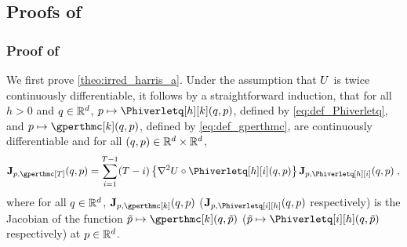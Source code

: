 \subsection{Proofs of }



\subsubsection{Proof of  }
\label{sec:proof-crefth-harris_0}
We first prove  \eqref{theo:irred_harris_a}.  Under the assumption that $U$ is twice continuously
  differentiable, it follows by a straightforward induction, that for
  all $h >0$ and $q \in \mathbb{R}^d$, $p \mapsto
  \Phiverletq[h][k](q,p)$, defined by  \eqref{eq:def_Phiverletq}, and $p \mapsto \gperthmc[k](q,p)$, defined by \eqref{eq:def_gperthmc}, are
  continuously differentiable and for all $(q,p) \in \mathbb{R}^d \times
  \mathbb{R}^d$,
\begin{equation}
  \Jac_{p,\gperthmc[T]}(q,p) =  \sum_{i=1}^{T-1}(T-i)\defEns{\nabla^2 \F \circ \Phiverletq[h][i](q,p)} \Jac_{p,\Phiverletq[h][i]}(q,p) \eqsp,
\end{equation}
where for all $q \in \mathbb{R}^d$, $\Jac_{p,\gperthmc[k]}(q,p)$ ($\Jac_{p,\Phiverletq[i][h]}(q,p)$ respectively) is the Jacobian of the function $\tilde{p} \mapsto
\gperthmc[k](q,\tilde{p})$ ($\tilde{p} \mapsto
\Phiverletq[i][h](q,\tilde{p})$ respectively) at $p \in \mathbb{R}^{d}$.


